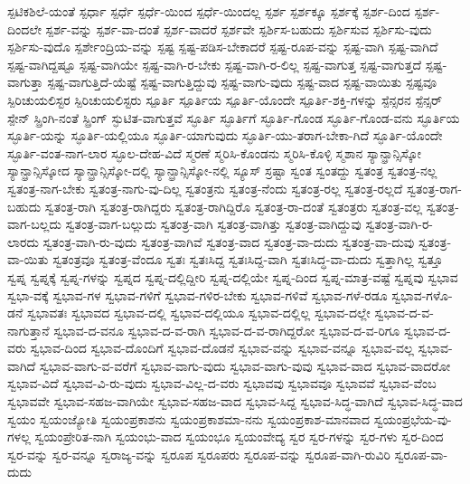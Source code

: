 {ಸ್ಪಟಿಕಶಿಲೆ-ಯಂತೆ
ಸ್ಪರ್ಧಾ
ಸ್ಪರ್ಧೆ
ಸ್ಪರ್ಧೆ-ಯಿಂದ
ಸ್ಪರ್ಧೆ-ಯಿಂದಲ್ಲ
ಸ್ಪರ್ಶ
ಸ್ಪರ್ಶಕ್ಕೂ
ಸ್ಪರ್ಶಕ್ಕೆ
ಸ್ಪರ್ಶ-ದಿಂದ
ಸ್ಪರ್ಶ-ದಿಂದಲೇ
ಸ್ಪರ್ಶ-ವನ್ನು
ಸ್ಪರ್ಶ-ವಾ-ದಂತೆ
ಸ್ಪರ್ಶ-ವಾದರೆ
ಸ್ಪರ್ಶವೇ
ಸ್ಪರ್ಶಿಸ-ಬಹುದು
ಸ್ಪರ್ಶಿಸುವ
ಸ್ಪರ್ಶಿಸು-ವುದು
ಸ್ಪರ್ಶಿಸು-ವುದೊ
ಸ್ಪರ್ಶೇಂದ್ರಿಯ-ವನ್ನು
ಸ್ಪಷ್ಟ
ಸ್ಪಷ್ಟ-ಪಡಿಸ-ಬೇಕಾದರೆ
ಸ್ಪಷ್ಟ-ರೂಪ-ವನ್ನು
ಸ್ಪಷ್ಟ-ವಾಗಿ
ಸ್ಪಷ್ಟ-ವಾಗಿದೆ
ಸ್ಪಷ್ಟ-ವಾಗಿದ್ದಷ್ಟೂ
ಸ್ಪಷ್ಟ-ವಾಗಿಯೇ
ಸ್ಪಷ್ಟ-ವಾಗಿ-ರ-ಬೇಕು
ಸ್ಪಷ್ಟ-ವಾಗಿ-ರ-ಲಿಲ್ಲ
ಸ್ಪಷ್ಟ-ವಾಗುತ್ತ
ಸ್ಪಷ್ಟ-ವಾಗುತ್ತದೆ
ಸ್ಪಷ್ಟ-ವಾಗುತ್ತಾ
ಸ್ಪಷ್ಟ-ವಾಗುತ್ತಿದೆ-ಯೆಷ್ಟೆ
ಸ್ಪಷ್ಟ-ವಾಗುತ್ತಿದ್ದುವು
ಸ್ಪಷ್ಟ-ವಾಗು-ವುದು
ಸ್ಪಷ್ಟ-ವಾದ
ಸ್ಪಷ್ಟ-ವಾಯಿತು
ಸ್ಪಷ್ಟವೂ
ಸ್ಪಿರಿಚುಯಲಿಸ್ಟರ
ಸ್ಪಿರಿಚುಯಲಿಸ್ಟರು
ಸ್ಪೂರ್ತಿ
ಸ್ಪೂರ್ತಿಯ
ಸ್ಪೂರ್ತಿ-ಯೊಂದೇ
ಸ್ಪೂರ್ತಿ-ಶಕ್ತಿ-ಗಳನ್ನು
ಸ್ಪೆನ್ಸರನ
ಸ್ಪೆನ್ಸರ್
ಸ್ಪೇನ್
ಸ್ಪ್ರಿಂಗಿ-ನಂತೆ
ಸ್ಪ್ರಿಂಗ್
ಸ್ಫುಟಿತ-ವಾಗುತ್ತವೆ
ಸ್ಫೂರ್ತಿ
ಸ್ಫೂರ್ತಿಗೆ
ಸ್ಫೂರ್ತಿ-ಗೊಂಡ
ಸ್ಫೂರ್ತಿ-ಗೊಂಡ-ವನು
ಸ್ಫೂರ್ತಿಯ
ಸ್ಫೂರ್ತಿ-ಯನ್ನು
ಸ್ಫೂರ್ತಿ-ಯಲ್ಲಿಯೂ
ಸ್ಫೂರ್ತಿ-ಯಾಗುವುದು
ಸ್ಫೂರ್ತಿ-ಯು-ತರಾಗ-ಬೇಕಾ-ಗಿದೆ
ಸ್ಫೂರ್ತಿ-ಯೊಂದೇ
ಸ್ಫೂರ್ತಿ-ವಂತ-ನಾಗ-ಲಾರ
ಸ್ಫೂಲ-ದೇಹ-ವಿದೆ
ಸ್ಮರಣೆ
ಸ್ಮರಿಸಿ-ಕೊಂಡನು
ಸ್ಮರಿಸಿ-ಕೊಳ್ಳಿ
ಸ್ಮಶಾನ
ಸ್ಯಾನ್ಫ್ರಾನ್ಸಿಸ್ಕೋ
ಸ್ಯಾನ್ಫ್ರಾನ್ಸಿಸ್ಕೋದ
ಸ್ಯಾನ್ಫ್ರಾನ್ಸಿಸ್ಕೋ-ದಲ್ಲಿ
ಸ್ಯಾನ್ಫ್ರಾನ್ಸಿಸ್ಕೋ-ನಲ್ಲಿ
ಸ್ಯೂಸ್
ಸ್ರಷ್ಟಾ
ಸ್ವಂತ
ಸ್ವಂತದ್ದು
ಸ್ವತಂತ್ರ
ಸ್ವತಂತ್ರ-ನಲ್ಲ
ಸ್ವತಂತ್ರ-ನಾಗ-ಬೇಕು
ಸ್ವತಂತ್ರ-ನಾಗು-ವು-ದಿಲ್ಲ
ಸ್ವತಂತ್ರನು
ಸ್ವತಂತ್ರ-ನೆಂದು
ಸ್ವತಂತ್ರ-ರಲ್ಲ
ಸ್ವತಂತ್ರ-ರಲ್ಲದೆ
ಸ್ವತಂತ್ರ-ರಾಗ-ಬಹುದು
ಸ್ವತಂತ್ರ-ರಾಗಿ
ಸ್ವತಂತ್ರ-ರಾಗಿದ್ದರು
ಸ್ವತಂತ್ರ-ರಾಗಿದ್ದಿರೊ
ಸ್ವತಂತ್ರ-ರಾ-ದಂತೆ
ಸ್ವತಂತ್ರರು
ಸ್ವತಂತ್ರ-ವಲ್ಲ
ಸ್ವತಂತ್ರ-ವಾಗ-ಬಲ್ಲದು
ಸ್ವತಂತ್ರ-ವಾಗ-ಬಲ್ಲುದು
ಸ್ವತಂತ್ರ-ವಾಗಿ
ಸ್ವತಂತ್ರ-ವಾಗಿತ್ತು
ಸ್ವತಂತ್ರ-ವಾಗಿದ್ದುವು
ಸ್ವತಂತ್ರ-ವಾಗಿ-ರ-ಲಾರದು
ಸ್ವತಂತ್ರ-ವಾಗಿ-ರು-ವುದು
ಸ್ವತಂತ್ರ-ವಾಗಿವೆ
ಸ್ವತಂತ್ರ-ವಾದ
ಸ್ವತಂತ್ರ-ವಾ-ದುದು
ಸ್ವತಂತ್ರ-ವಾ-ದುವು
ಸ್ವತಂತ್ರ-ವಾ-ಯಿತು
ಸ್ವತಂತ್ರವೂ
ಸ್ವತಂತ್ರ-ವೆಂದೂ
ಸ್ವತಃ
ಸ್ವತಃಸಿದ್ದ
ಸ್ವತಃಸಿದ್ದ-ವಾಗಿ
ಸ್ವತಃಸಿದ್ಧ-ವಾ-ದುದು
ಸ್ವತ್ತಾಗಿಲ್ಲ
ಸ್ವತ್ತೂ
ಸ್ವಪ್ನ
ಸ್ವಪ್ನಕ್ಕೆ
ಸ್ವಪ್ನ-ಗಳನ್ನು
ಸ್ವಪ್ನದ
ಸ್ವಪ್ನ-ದಲ್ಲಿದ್ದೀರಿ
ಸ್ವಪ್ನ-ದಲ್ಲಿಯೇ
ಸ್ವಪ್ನ-ದಿಂದ
ಸ್ವಪ್ನ-ಮಾತ್ರ-ವಷ್ಟೆ
ಸ್ವಪ್ನವು
ಸ್ವಭಾವ
ಸ್ವಭಾ-ವಕ್ಕೆ
ಸ್ವಭಾವ-ಗಳ
ಸ್ವಭಾವ-ಗಳಿಗೆ
ಸ್ವಭಾವ-ಗಳಿರ-ಬೇಕು
ಸ್ವಭಾವ-ಗಳಿವೆ
ಸ್ವಭಾವ-ಗಳೆ-ರಡೂ
ಸ್ವಭಾವ-ಗಳೊ-ಡನೆ
ಸ್ವಭಾವತಃ
ಸ್ವಭಾವದ
ಸ್ವಭಾವ-ದಲ್ಲಿ
ಸ್ವಭಾವ-ದಲ್ಲಿಯೂ
ಸ್ವಭಾವ-ದಲ್ಲಿಲ್ಲ
ಸ್ವಭಾವ-ದಲ್ಲೇ
ಸ್ವಭಾವ-ದ-ವ-ನಾಗುತ್ತಾನೆ
ಸ್ವಭಾವ-ದ-ವನೂ
ಸ್ವಭಾವ-ದ-ವ-ರಾಗಿ
ಸ್ವಭಾವ-ದ-ವ-ರಾಗಿದ್ದರೋ
ಸ್ವಭಾವ-ದ-ವ-ರಿಗೂ
ಸ್ವಭಾವ-ದ-ವರು
ಸ್ವಭಾವ-ದಿಂದ
ಸ್ವಭಾವ-ದೊಂದಿಗೆ
ಸ್ವಭಾವ-ದೊಡನೆ
ಸ್ವಭಾವ-ವನ್ನು
ಸ್ವಭಾವ-ವನ್ನೂ
ಸ್ವಭಾವ-ವಲ್ಲ
ಸ್ವಭಾವ-ವಾಗಿದೆ
ಸ್ವಭಾವ-ವಾಗು-ವ-ವರೆಗೆ
ಸ್ವಭಾವ-ವಾಗು-ವುದು
ಸ್ವಭಾವ-ವಾಗು-ವುವು
ಸ್ವಭಾವ-ವಾದ
ಸ್ವಭಾವ-ವಾದರೋ
ಸ್ವಭಾವ-ವಿದೆ
ಸ್ವಭಾವ-ವಿ-ರು-ವುದು
ಸ್ವಭಾವ-ವಿಲ್ಲ-ದ-ವರು
ಸ್ವಭಾವವು
ಸ್ವಭಾವವೂ
ಸ್ವಭಾವವೆ
ಸ್ವಭಾವ-ವೆಂಬ
ಸ್ವಭಾವವೇ
ಸ್ವಭಾವ-ಸಹಜ-ವಾಗಿಯೇ
ಸ್ವಭಾವ-ಸಹಜ-ವಾದ
ಸ್ವಭಾವ-ಸಿದ್ದ
ಸ್ವಭಾವ-ಸಿದ್ಧ-ವಾಗಿದೆ
ಸ್ವಭಾವ-ಸಿದ್ಧ-ವಾದ
ಸ್ವಯಂ
ಸ್ವಯಂಜ್ಯೋತಿ
ಸ್ವಯಂಪ್ರಕಾಶನು
ಸ್ವಯಂಪ್ರಕಾಶಮಾ-ನನು
ಸ್ವಯಂಪ್ರಕಾಶ-ಮಾನವಾದ
ಸ್ವಯಂಪ್ರಭೆಯ-ವು-ಗಳಲ್ಲ
ಸ್ವಯಂಪ್ರೇರಿತ-ನಾಗಿ
ಸ್ವಯಂಭು-ವಾದ
ಸ್ವಯಂಭೂ
ಸ್ವಯಂವೇದ್ಯ
ಸ್ವರ
ಸ್ವರ-ಗಳನ್ನು
ಸ್ವರ-ಗಳು
ಸ್ವರ-ದಿಂದ
ಸ್ವರ-ವನ್ನು
ಸ್ವರ-ವನ್ನೂ
ಸ್ವರಾಜ್ಯ-ವನ್ನು
ಸ್ವರೂಪ
ಸ್ವರೂಪರು
ಸ್ವರೂಪ-ವನ್ನು
ಸ್ವರೂಪ-ವಾಗಿ-ರುವಿರಿ
ಸ್ವರೂಪ-ವಾ-ದುದು
}
